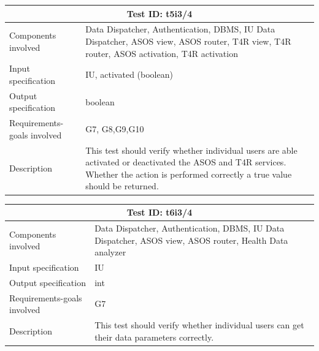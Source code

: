 \begin{table}[H]
\centering
\begin{tabular}{ |p{4.5cm}||p{11cm}|  }
 \hline
 \multicolumn{2}{|c|}{Test ID: t5i3/4} \\
 
 \hline 
 Components involved  	&    Data Dispatcher, Authentication, DBMS, IU Data Dispatcher, ASOS view, ASOS router, T4R view, T4R router, ASOS activation, T4R activation\\
 Input specification  	&  	 IU, activated (boolean)\\
Output specification  	& 	  	boolean\\
Requirements-goals involved &  G7, G8,G9,G10\\
Description  	& 	 	   This test should verify whether individual users are able activated or deactivated the ASOS and T4R services. Whether the action is performed correctly a true value should be returned. \\
 \hline
\end{tabular}
\end{table}
\begin{table}[H]
\centering
\begin{tabular}{ |p{4.5cm}||p{11cm}|  }
 \hline
 \multicolumn{2}{|c|}{Test ID: t6i3/4} \\
 
 \hline 
 Components involved  	&    Data Dispatcher, Authentication, DBMS, IU Data Dispatcher,  ASOS view, ASOS router, Health Data analyzer\\
 Input specification  	&  	 IU\\
Output specification  	& 	  	int\\
Requirements-goals involved &  G7\\
Description  	& 	 	   This test should verify whether individual users can get their data parameters correctly. \\
 \hline
\end{tabular}
\end{table}
